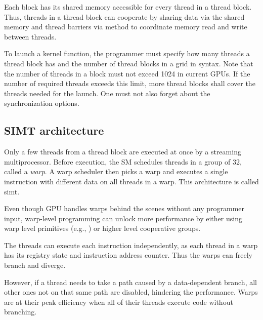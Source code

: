 
Each block has its shared memory accessible for every thread in a thread block. Thus, threads in a thread block can cooperate by sharing data via the shared memory and thread barriers via  method to coordinate memory read and write between threads.

To launch a kernel function, the programmer must specify how many threads a thread block has and the number of thread blocks in a grid in  syntax. Note that the number of threads in a block must not exceed 1024 in current GPUs. If the number of required threads exceeds this limit, more thread blocks shall cover the threads needed for the launch. One must not also forget about the synchronization options.

\subsection{SIMT architecture}

Only a few threads from a thread block are executed at once by a streaming multiprocessor. Before execution, the SM schedules threads in a group of 32, called a \textit{warp}. A warp scheduler then picks a warp and executes a single instruction with different data on all threads in a warp. This architecture is called \acrfull{simt}.

Even though GPU handles warps behind the scenes without any programmer input, warp-level programming can unlock more performance by either using warp level primitives (e.g., ) or higher level cooperative groups.

The threads can execute each instruction independently, as each thread in a warp has its registry state and instruction address counter. Thus the warps can freely branch and diverge.

However, if a thread needs to take a path caused by a data-dependent branch, all other ones not on that same path are disabled, hindering the performance. Warps are at their peak efficiency when all of their threads execute code without branching.